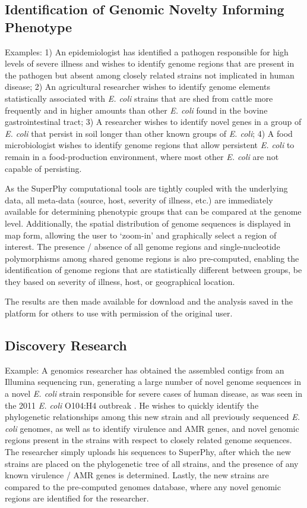 \documentclass[a4paper,twoside]{article}
\begin{document}
\subsection{Identification of Genomic Novelty Informing Phenotype}
Examples: 1) An epidemiologist has identified a pathogen responsible for high levels of severe illness and wishes to identify genome regions that are present in the pathogen but absent among closely related strains not implicated in human disease; 2) An agricultural researcher wishes to identify genome elements statistically associated with \textit{E. coli} strains that are shed from cattle more frequently and in higher amounts than other \textit{E. coli} found in the bovine gastrointestinal tract; 3) A researcher wishes to identify novel genes in a group of \textit{E. coli} that persist in soil longer than other known groups of \textit{E. coli}; 4) A food microbiologist wishes to identify genome regions that allow persistent \textit{E. coli} to remain in a food-production environment, where most other \textit{E. coli} are not capable of persisting.

As the SuperPhy computational tools are tightly coupled with the underlying data, all meta-data (source, host, severity of illness, etc.) are immediately available for determining phenotypic groups that can be compared at the genome level. Additionally, the spatial distribution of genome sequences is displayed in map form, allowing the user to `zoom-in' and graphically select a region of interest. The presence / absence of all genome regions and single-nucleotide polymorphisms among shared genome regions is also pre-computed, enabling the identification of genome regions that are statistically different between groups, be they based on severity of illness, host, or geographical location.

The results are then made available for download and the analysis saved in the platform for others to use with permission of the original user.

\subsection{Discovery Research}
Example: A genomics researcher has obtained the assembled contigs from an Illumina sequencing run, generating a large number of novel genome sequences in a novel \textit{E. coli} strain responsible for severe cases of human disease, as was seen in the 2011 \textit{E. coli} O104:H4 outbreak \cite{mellmann_prospective_2011}. He wishes to quickly identify the phylogenetic relationships among this new strain and all previously sequenced \textit{E. coli} genomes, as well as to identify virulence and AMR genes, and novel genomic regions present in the strains with respect to closely related genome sequences. The researcher simply uploads his sequences to SuperPhy, after which the new strains are placed on the phylogenetic tree of all strains, and the presence of any known virulence / AMR genes is determined. Lastly, the new strains are compared to the pre-computed genomes database, where any novel genomic regions are identified for the researcher.
\end{document}
